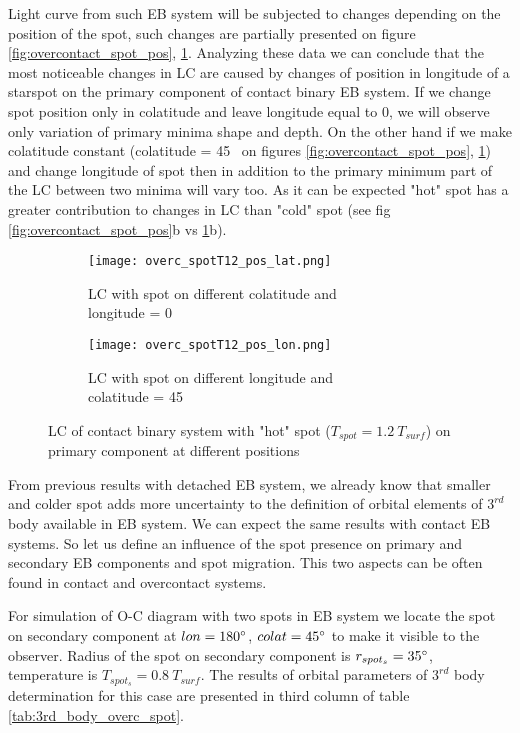 Light curve from such EB system will be subjected to changes depending on the position of the spot, such changes are partially presented on figure \ref{fig:overcontact_spot_pos}, \ref{fig:overcontact_spotT12_pos}. Analyzing these data we can conclude that the most noticeable changes in LC are caused by changes of position in longitude of a starspot on the primary component of contact binary EB system.
If we change spot position only in colatitude and leave longitude equal to 0\degree, we will observe only variation of primary minima shape and depth. On the other hand if we make colatitude constant (colatitude = 45\degree~ on figures \ref{fig:overcontact_spot_pos}, \ref{fig:overcontact_spotT12_pos}) and change longitude of spot then in addition to the primary minimum part of the LC between two minima will vary too. As it can be expected "hot" spot has a greater contribution to changes in LC than "cold" spot (see fig \ref{fig:overcontact_spot_pos}b vs \ref{fig:overcontact_spotT12_pos}b). 

\begin{figure}[!h]
    \centering
    \begin{subfigure}[t]{0.5\textwidth}
        \centering
        \texttt{[image: overc\_spotT12\_pos\_lat.png]}
        \caption{LC with spot on different colatitude and \\longitude = 0\degree}
    \end{subfigure}%
    \begin{subfigure}[t]{0.5\textwidth}
        \centering
        \texttt{[image: overc\_spotT12\_pos\_lon.png]}
        \caption{LC with spot on different longitude and \\colatitude = 45\degree}
    \end{subfigure}
    \caption{LC of contact binary system with "hot" spot ($T_{spot}=1.2~T_{surf}$) on primary component at different positions}
\label{fig:overcontact_spotT12_pos}
\end{figure}

From previous results with detached EB system, we already know that smaller and colder spot adds more uncertainty to the definition of orbital elements of $3^{rd}$ body available in EB system. We can expect the same results with contact EB systems. 
So let us define an influence of the spot presence on primary and secondary EB components and spot migration. This two aspects can be often found in contact and overcontact systems.

For simulation of O-C diagram with two spots in EB system we locate the spot on secondary component at $lon=180\degree$, $colat=45\degree$ to make it visible to the observer. Radius of the spot on secondary component is $r_{spot_s}=35\degree$, temperature is $T_{spot_s}=0.8~T_{surf}$. The results of orbital parameters of $3^{rd}$ body determination for this case are presented in third column of table \ref{tab:3rd_body_overc_spot}.   

